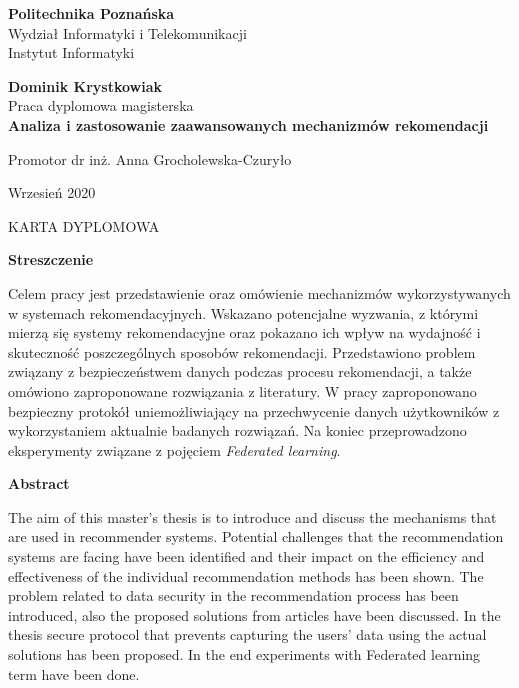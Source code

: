 \documentclass[a4paper,12pt,twoside,openany]{report}
\begin{document}
\begin{titlepage}
    \begin{center}
        \large
        \textbf{Politechnika Poznańska}\\
        Wydział Informatyki i Telekomunikacji\\
        Instytut Informatyki\\
        \vspace{1.5cm}
            
        \textbf{Dominik Krystkowiak}\\
        Praca dyplomowa magisterska\\
        
        \vspace{1cm}
        \Huge
        \textbf{
        Analiza i zastosowanie zaawansowanych mechanizmów rekomendacji}
            
        \vfill
        \begin{flushright}\large
        Promotor dr inż. Anna Grocholewska-Czuryło\end{flushright}
        \vspace{0.8cm}
            
        \large
        Wrzesień 2020
            
    \end{center}
\end{titlepage}

\thispagestyle{empty}\vspace*{\fill}%
\begin{center}KARTA DYPLOMOWA\end{center}%
\vfill\cleardoublepage%

\thispagestyle{plain}
\begin{center}
    \textbf{Streszczenie}
\end{center}
Celem pracy jest przedstawienie oraz omówienie mechanizmów wykorzystywanych w systemach rekomendacyjnych. Wskazano potencjalne wyzwania, z którymi mierzą się systemy rekomendacyjne oraz pokazano ich wpływ na wydajność i skuteczność poszczególnych sposobów rekomendacji. Przedstawiono problem związany z bezpieczeństwem danych podczas procesu rekomendacji, a także omówiono zaproponowane rozwiązania z literatury. W pracy zaproponowano bezpieczny protokół uniemożliwiający na przechwycenie danych użytkowników z wykorzystaniem aktualnie badanych rozwiązań. Na koniec przeprowadzono eksperymenty związane z pojęciem \textit{Federated learning}.
\begin{center}
    \textbf{Abstract}
\end{center}
The aim of this master's thesis is to introduce and discuss the mechanisms that are used in recommender systems. Potential challenges that the recommendation systems are facing have been identified and their impact on the efficiency and effectiveness of the individual recommendation methods has been shown. The problem related to data security in the recommendation process has been introduced, also the proposed solutions from articles have been discussed. In the thesis secure protocol that prevents capturing the users' data using the actual solutions has been proposed. In the end experiments with Federated learning term have been done.

\tableofcontents* 
\cleardoublepage%







\medskip



\end{document}
